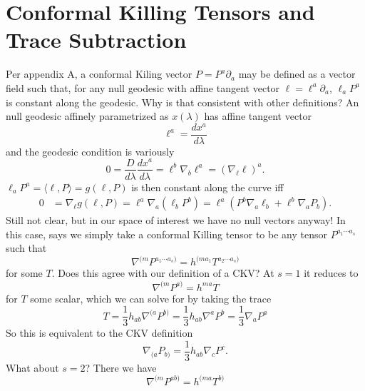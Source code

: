 \documentclass[11pt,letterpaper]{article}
\newcommand{\LP}{\left(}
\newcommand{\RP}{\right)}
\newcommand{\D}{\partial}
\begin{document}
\section{Conformal Killing Tensors and Trace Subtraction}
Per \cite{Geroch:1970cc} appendix A, a conformal Kiling vector $P = P^a \D_a$ may be defined as a vector field such that, for any null geodesic with affine tangent vector $\ell = \ell^a \D_a$, $\ell_a P^a$ is constant along the geodesic. Why is that consistent with other definitions? An null geodesic affinely parametrized as $x(\lambda)$ has affine tangent vector \begin{equation}
\ell^a = \frac{dx^a}{d \lambda}
\end{equation}
and the geodesic condition is variously \begin{equation}
0 = \frac{D}{d \lambda} \frac{dx^a}{d \lambda} = \ell^b \nabla_b \ell^a = \LP \nabla_\ell \ell \RP^a.
\end{equation}
$\ell_a P^a = \langle \ell, P \rangle = g(\ell, P)$ is then constant along the curve iff \begin{equation}
\begin{aligned}
0 & = \nabla_\ell g(\ell, P) = \ell^a \nabla_a (\ell_b P^b) = \ell^a \LP P^b \nabla_a \ell_b + \ell^b \nabla_a P_b \RP.
\end{aligned}
\end{equation}
Still not clear, but in our space of interest we have no null vectors anyway! In this case, \cite{Geroch:1970cc} says we simply take a conformal Killing tensor to be any tensor $P^{a_1 \cdots a_s}$ such that \begin{equation}
\nabla^{(m} P^{a_1 \cdots a_s)} = h^{(m a_1} T^{a_2 \cdots a_s)}
\end{equation}
for some $T$. Does this agree with our definition of a CKV? At $s = 1$ it reduces to \begin{equation}
\nabla^{(m} P^{a)} = h^{ma} T
\end{equation}
for $T$ some scalar, which we can solve for by taking the trace \begin{equation}
T = \frac{1}{3} h_{ab} \nabla^{(a} P^{b)} = \frac{1}{3} h_{ab} \nabla^a P^b = \frac{1}{3} \nabla_a P^a
\end{equation}
So this is equivalent to the CKV definition \begin{equation}
\nabla_{(a} P_{b)} = \frac{1}{3} h_{ab} \nabla_c P^c.
\end{equation}
What about $s = 2$? There we have \begin{equation}
\nabla^{(m} P^{a b)} = h^{(ma} T^{b)}
\end{equation}
\end{document}
